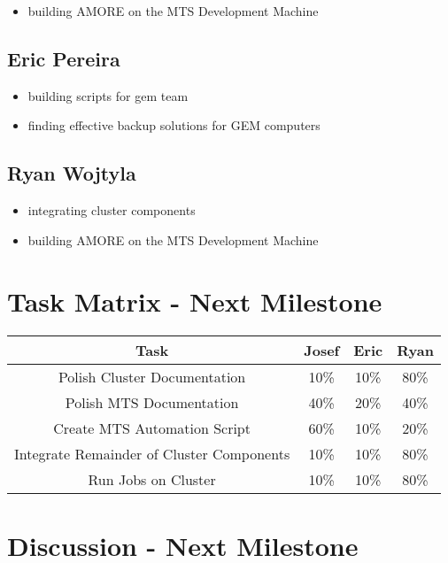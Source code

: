 \documentclass[12pt]{article}
\begin{document}
\begin{itemize}
\item building AMORE on the MTS Development Machine
\end{itemize}

\subsection{Eric Pereira}

\begin{itemize}
\item building scripts for gem team
\item finding effective backup solutions for GEM computers
\end{itemize}

\subsection{Ryan Wojtyla}

\begin{itemize}
\item integrating cluster components
\item building AMORE on the MTS Development Machine
\end{itemize}

\section{Task Matrix - Next Milestone}

\begin{center}
  \begin{tabular}{|c|c|c|c|}
    \hline
    Task & Josef & Eric & Ryan \\
    \hline
    Polish Cluster Documentation & 10\% & 10\% & 80\% \\
    Polish MTS Documentation & 40\% & 20\% & 40\% \\
    Create MTS Automation Script & 60\% & 10\% & 20\% \\
    Integrate Remainder of Cluster Components & 10\% & 10\% & 80\% \\
    Run Jobs on Cluster & 10\% & 10\% & 80\% \\
    \hline
  \end{tabular}
\end{center}

\section{Discussion - Next Milestone}
\end{document}
